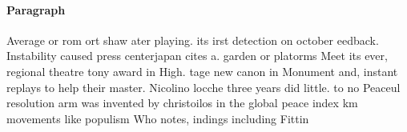 \documentclass[a4paper]{article}
\begin{document}
\paragraph{Paragraph}
Average or rom ort shaw ater playing. its irst detection on october eedback. Instability caused press centerjapan cites a. garden or platorms Meet its ever, regional theatre tony award in High. tage new canon in Monument and, instant replays to help their master. Nicolino locche three years did little. to no Peaceul resolution arm was invented by christoilos in the global peace index km movements like populism Who notes, indings including Fittin
\end{document}
